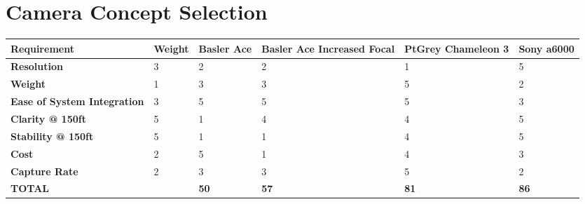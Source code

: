 \documentclass[]{auvsi_doc}
\begin{document}
\begin{AUVSITitlePage}
\begin{artifacttable}
\end{artifacttable}
\end{AUVSITitlePage}

\section{Camera Concept Selection}
\begin{table}[H]
	\centering
	\begin{tabular}{|p{3.45cm}|p{1.5cm}|p{1.55cm}|p{2.5cm}|p{2.5cm}|p{2.0cm}|}
	\hline
	\rowcolor[HTML]{C0C0C0}
{\color[HTML]{000000} \textbf{Requirement}} & {\color[HTML]{000000} \textbf{Weight}} & {\color[HTML]{000000} \textbf{Basler Ace}} & {\color[HTML]{000000} \textbf{Basler Ace Increased Focal}} & {\color[HTML]{000000} \textbf{PtGrey Chameleon 3}} & {\color[HTML]{000000} \textbf{Sony a6000}}\\ \hline
{\color[HTML]{000000} \textbf{Resolution}}	& 3	& 2	& 2	& 1	& 5 \\ \hline
{\color[HTML]{000000} \textbf{Weight}}	&	1	&	3 &	3 	& 	5 	&	2 \\ \hline 
{\color[HTML]{000000} \textbf{Ease of System Integration}}	&	3 	&	5 	& 	5 	& 	5 	& 	3 \\ \hline
{\color[HTML]{000000} \textbf{Clarity @ 150ft}}	&	5 	&	1 	& 	4	&	4	&	5 \\ \hline
{\color[HTML]{000000} \textbf{Stability @ 150ft}}	&	5 	&	1 	&	1 	&	4	&	5 \\ \hline
{\color[HTML]{000000} \textbf{Cost}}	&	2 	&	5 	&	1 	&	4	&	3 \\ \hline
{\color[HTML]{000000} \textbf{Capture Rate}}	&	2 	&	3 	&	3 	&	5 	&	2 \\ \hline
\rowcolor[HTML]{C0C0C0}
{\color[HTML]{000000} \textbf{TOTAL}}	&	&	{\color[HTML]{000000} \textbf{50}}	&	{\color[HTML]{000000} \textbf{57}}	&	{\color[HTML]{000000} \textbf{81}}	&	{\color[HTML]{000000} \textbf{86}} \\ \hline

	\end{tabular}
\end{table}
\end{document}
